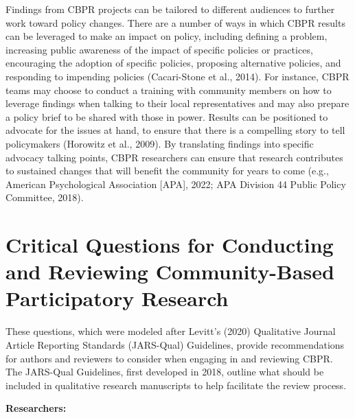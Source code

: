 \documentclass[
  11pt,
]{book}
\begin{document}
Findings from CBPR projects can be tailored to different audiences to further work toward policy changes. There are a number of ways in which CBPR results can be leveraged to make an impact on policy, including defining a problem, increasing public awareness of the impact of specific policies or practices, encouraging the adoption of specific policies, proposing alternative policies, and responding to impending policies (Cacari-Stone et al., 2014). For instance, CBPR teams may choose to conduct a training with community members on how to leverage findings when talking to their local representatives and may also prepare a policy brief to be shared with those in power. Results can be positioned to advocate for the issues at hand, to ensure that there is a compelling story to tell policymakers (Horowitz et al., 2009). By translating findings into specific advocacy talking points, CBPR researchers can ensure that research contributes to sustained changes that will benefit the community for years to come (e.g., American Psychological Association {[}APA{]}, 2022; APA Division 44 Public Policy Committee, 2018).

\hypertarget{critical-questions-for-conducting-and-reviewing-community-based-participatory-research}{%
\section{Critical Questions for Conducting and Reviewing Community-Based Participatory Research}\label{critical-questions-for-conducting-and-reviewing-community-based-participatory-research}}

These questions, which were modeled after Levitt's (2020) Qualitative Journal Article Reporting Standards (JARS-Qual) Guidelines, provide recommendations for authors and reviewers to consider when engaging in and reviewing CBPR. The JARS-Qual Guidelines, first developed in 2018, outline what should be included in qualitative research manuscripts to help facilitate the review process.

\textbf{Researchers:}
\end{document}
